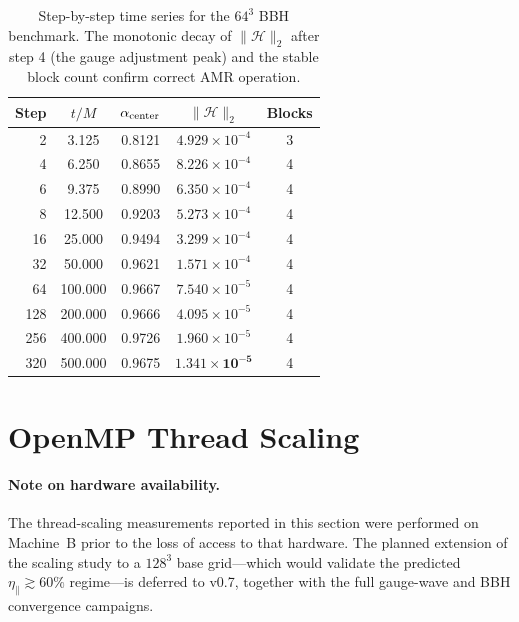\documentclass[aps,prd,twocolumn,superscriptaddress,nofootinbib,showpacs,
               longbibliography]{revtex4-2}
\newcommand{\norm}[1]{\|#1\|}
\begin{document}
\begin{table}[t]
\caption{Step-by-step time series for the $64^3$ BBH benchmark.
  The monotonic decay of $\norm{\mathcal{H}}_2$ after step 4 (the gauge
  adjustment peak) and the stable block count confirm correct AMR operation.}
\label{tab:bbh_timeseries}
\begin{ruledtabular}
\begin{tabular}{rcccc}
  Step & $t/M$ & $\alpha_{\rm center}$ & $\norm{\mathcal{H}}_2$ & Blocks \\ \hline
     2 &   3.125 & 0.8121 & $4.929\times10^{-4}$ & 3 \\
     4 &   6.250 & 0.8655 & $8.226\times10^{-4}$ & 4 \\
     6 &   9.375 & 0.8990 & $6.350\times10^{-4}$ & 4 \\
     8 &  12.500 & 0.9203 & $5.273\times10^{-4}$ & 4 \\
    16 &  25.000 & 0.9494 & $3.299\times10^{-4}$ & 4 \\
    32 &  50.000 & 0.9621 & $1.571\times10^{-4}$ & 4 \\
    64 & 100.000 & 0.9667 & $7.540\times10^{-5}$ & 4 \\
   128 & 200.000 & 0.9666 & $4.095\times10^{-5}$ & 4 \\
   256 & 400.000 & 0.9726 & $1.960\times10^{-5}$ & 4 \\
   320 & 500.000 & 0.9675 & $\mathbf{1.341\times10^{-5}}$ & 4 \\
\end{tabular}
\end{ruledtabular}
\end{table}

\section{OpenMP Thread Scaling}
\label{sec:scaling}

\paragraph{Note on hardware availability.}
The thread-scaling measurements reported in this section were performed on
Machine~B prior to the loss of access to that hardware.
The planned extension of the scaling study to a $128^3$ base grid---which
would validate the predicted $\eta_\parallel \gtrsim 60\%$ regime---is
deferred to v0.7, together with the full gauge-wave and BBH convergence
campaigns.
\end{document}
